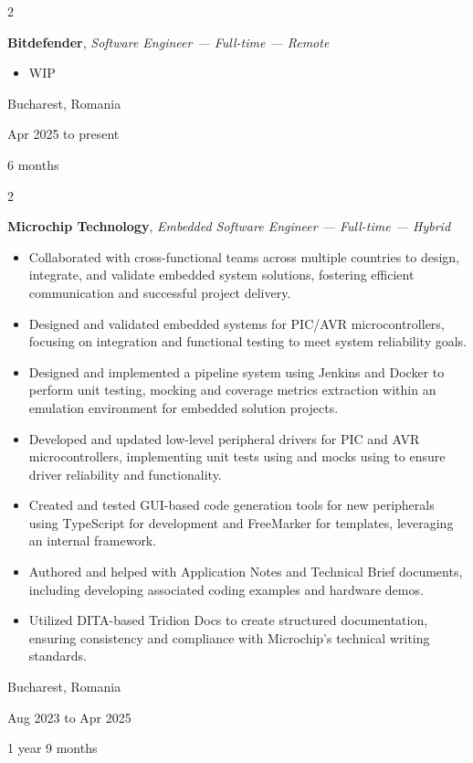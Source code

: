 \documentclass[10pt, a4paper]{article}
\newenvironment{highlights}{
    \begin{itemize}[
        topsep=0.1 cm,
        parsep=0.1 cm,
        partopsep=0pt,
        itemsep=0pt,
        leftmargin=0 cm + 10pt
    ]
}{
    \end{itemize}
} %
\newenvironment{twocolentry}[2][]{
    \onecolentry
    \def\secondColumn{#2}
    \setcolumnwidth{\fill, 3.5 cm}
    \begin{paracol}{2}
}{
    \switchcolumn \raggedleft \secondColumn
    \end{paracol}
    \endonecolentry
} %
\let\hrefWithoutArrow\href
\renewcommand{\href}[2]{\hrefWithoutArrow{#1}{\ifthenelse{\equal{#2}{}}{ }{#2 }\raisebox{.15ex}{\footnotesize \faExternalLink*}}}
\begin{document}
        
        \begin{twocolentry}{
            Bucharest, Romania

        Apr 2025 to present

        6 months
        }
            \textbf{Bitdefender}, \textit{Software Engineer — Full-time — Remote}
            \begin{highlights}
                \item WIP
            \end{highlights}
        \end{twocolentry}


        \vspace{0.2 cm}

        \begin{twocolentry}{
            Bucharest, Romania

        Aug 2023 to Apr 2025

        1 year 9 months
        }
            \textbf{Microchip Technology}, \textit{Embedded Software Engineer — Full-time — Hybrid}
            \begin{highlights}
                \item Collaborated with cross-functional teams across multiple countries to design, integrate, and validate embedded system solutions, fostering efficient communication and successful project delivery.
                \item Designed and validated embedded systems for PIC/AVR microcontrollers, focusing on integration and functional testing to meet system reliability goals.
                \item Designed and implemented a pipeline system using Jenkins and Docker to perform unit testing, mocking and coverage metrics extraction within an emulation environment for embedded solution projects.
                \item Developed and updated low-level peripheral drivers for PIC and AVR microcontrollers, implementing unit tests using \href{https://www.throwtheswitch.org/unity}{Unity} and mocks using \href{https://github.com/ThrowTheSwitch/CMock}{CMock} to ensure driver reliability and functionality.
                \item Created and tested GUI-based code generation tools for new peripherals using TypeScript for development and FreeMarker for templates, leveraging an internal framework.
                \item Authored and helped with Application Notes and Technical Brief documents, including developing associated coding examples and hardware demos.
                \item Utilized DITA-based Tridion Docs to create structured documentation, ensuring consistency and compliance with Microchip’s technical writing standards.
            \end{highlights}
        \end{twocolentry}
\end{document}
